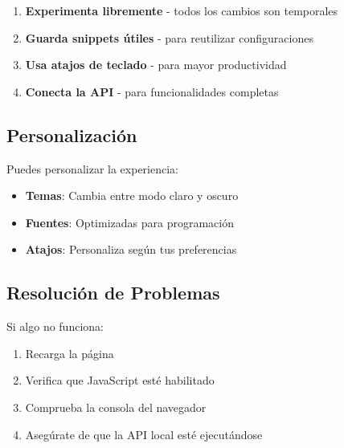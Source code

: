 \documentclass[
  11pt,
  letterpaper,
  oneside,
  openany]{scrbook}
\providecommand{\tightlist}{%
  \setlength{\itemsep}{0pt}\setlength{\parskip}{0pt}}
\begin{document}
\begin{tcolorbox}[enhanced jigsaw, coltitle=black, breakable, arc=.35mm, toprule=.15mm, colbacktitle=quarto-callout-note-color!10!white, colframe=quarto-callout-note-color-frame, opacityback=0, colback=white, bottomtitle=1mm, bottomrule=.15mm, rightrule=.15mm, left=2mm, toptitle=1mm, leftrule=.75mm, title=\textcolor{quarto-callout-note-color}{\faInfo}\hspace{0.5em}{Mejores Prácticas}, titlerule=0mm, opacitybacktitle=0.6]

\begin{enumerate}
\def\labelenumi{\arabic{enumi}.}
\tightlist
\item
  \textbf{Experimenta libremente} - todos los cambios son temporales
\item
  \textbf{Guarda snippets útiles} - para reutilizar configuraciones
\item
  \textbf{Usa atajos de teclado} - para mayor productividad
\item
  \textbf{Conecta la API} - para funcionalidades completas
\end{enumerate}

\end{tcolorbox}

\subsection{Personalización}\label{personalizaciuxf3n}

Puedes personalizar la experiencia:

\begin{itemize}
\tightlist
\item
  \textbf{Temas}: Cambia entre modo claro y oscuro
\item
  \textbf{Fuentes}: Optimizadas para programación
\item
  \textbf{Atajos}: Personaliza según tus preferencias
\end{itemize}

\subsection{Resolución de Problemas}\label{resoluciuxf3n-de-problemas}

Si algo no funciona:

\begin{enumerate}
\def\labelenumi{\arabic{enumi}.}
\tightlist
\item
  Recarga la página
\item
  Verifica que JavaScript esté habilitado
\item
  Comprueba la consola del navegador
\item
  Asegúrate de que la API local esté ejecutándose
\end{enumerate}
\end{document}
